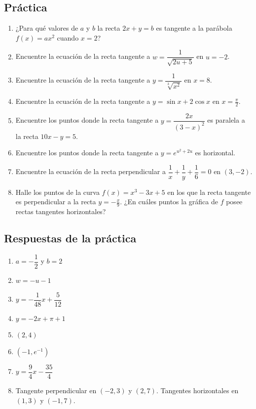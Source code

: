 \documentclass[12pt]{article}
\begin{document}
\subsection{Práctica}
\begin{enumerate}
    \item ¿Para qué valores de $a$ y $b$ la recta $2x + y = b$ es tangente a la parábola $f(x) = ax^2$ cuando $x = 2$?
    \item Encuentre la ecuación de la recta tangente a $w = \dfrac{1}{\sqrt{2u + 5}}$ en $u = -2$.
    \item Encuentre la ecuación de la recta tangente a $y = \dfrac{1}{\sqrt[3]{x^2}}$ en $x = 8$.
    \item Encuentre la ecuación de la recta tangente a $y = \sin x + 2\cos x$ en $x = \frac{\pi}{2}$.
    \item Encuentre los puntos donde la recta tangente a $y = \dfrac{2x}{(3 - x)^2}$ es paralela a la recta $10x - y = 5$.
    \item Encuentre los puntos donde la recta tangente a $y = e^{u^2 + 2u}$ es horizontal.
    \item Encuentre la ecuación de la recta perpendicular a $\dfrac{1}{x} + \dfrac{1}{y} + \dfrac{1}{6} = 0$ en $(3, -2)$.
    \item Halle los puntos de la curva $f(x) = x^3 - 3x + 5$ en los que la recta tangente es perpendicular a la recta $y = -\frac{x}{9}$. ¿En cuáles puntos la gráfica de $f$ posee rectas tangentes horizontales?
\end{enumerate}

\subsection{Respuestas de la práctica}
\begin{enumerate}
    \item $a = -\dfrac{1}{2}$ y $b = 2$
    \item $w = -u - 1$
    \item $y = -\dfrac{1}{48}x + \dfrac{5}{12}$
    \item $y = -2x + \pi + 1$
    \item $(2, 4)$
    \item $\left(-1, e^{-1}\right)$
    \item $y = \dfrac{9}{4}x - \dfrac{35}{4}$
    \item Tangente perpendicular en $(-2, 3)$ y $(2, 7)$. Tangentes horizontales en $(1, 3)$ y $(-1, 7)$.
\end{enumerate}
\end{document}
